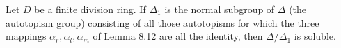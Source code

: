 Let $D$ be a finite division ring. If $\Delta_1$ is the normal subgroup of $\Delta$ (the autotopism group) consisting of all those autotopisms for which the three mappings $\alpha_r, \alpha_l, \alpha_m$ of Lemma 8.12 are all the identity, then $\Delta / \Delta_1$ is soluble.
